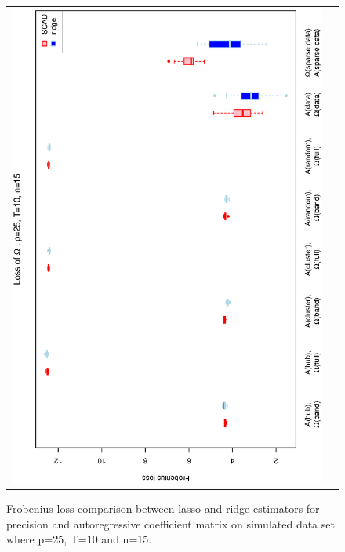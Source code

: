 \documentclass[a4paper]{article}
\begin{document}
\begin{figure}[h!]
\begin{tabular}{cc}
\includegraphics[scale=0.5,angle=270]{LossOmega25T10N15.eps}\\
\end{tabular}
\caption{Frobenius loss comparison between lasso and ridge estimators for precision and autoregressive coefficient matrix on simulated data set where p=25, T=10 and n=15.}
\label{fig:Loss25T20N5}
\end{figure}
\end{document}
